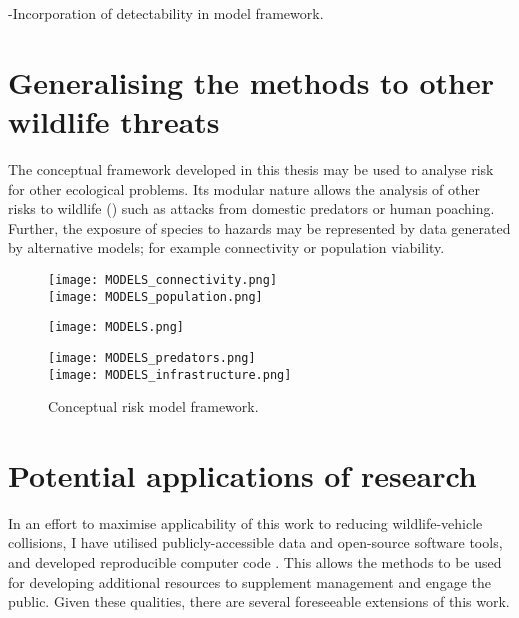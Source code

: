 -Incorporation of detectability in model framework.

\section{Generalising the methods to other wildlife threats}

The conceptual framework developed in this thesis may be used to analyse risk for other ecological problems. Its modular nature allows the analysis of other risks to wildlife () such as attacks from domestic predators or human poaching. Further, the exposure of species to hazards may be represented by data generated by alternative models; for example connectivity or population viability.

\begin{figure*}[htp]
  \centering
  	\begin{minipage}[t][][b]{.13\textwidth}
    	\centering
    	\texttt{[image: MODELS\_connectivity.png]}\\
    	\texttt{[image: MODELS\_population.png]}   	
    \end{minipage}
    \hspace{.05\textwidth}
  	\begin{minipage}{.38\textwidth}
    	\centering
    	\texttt{[image: MODELS.png]}
    \end{minipage}
    \hspace{.05\textwidth}
  	\begin{minipage}[t][][b]{.13\textwidth}
    	\centering
    	\texttt{[image: MODELS\_predators.png]}\\
    	\texttt{[image: MODELS\_infrastructure.png]}
    \end{minipage}    	   	   
  \caption[Conceptual risk model framework]{Conceptual risk model framework.}
  \label{gen_framework}
\end{figure*}

\section{Potential applications of research}

In an effort to maximise applicability of this work to reducing wildlife-vehicle collisions, I have utilised publicly-accessible data and open-source software tools, and developed reproducible computer code . This allows the methods to be used for developing additional resources to supplement management and engage the public. Given these qualities, there are several foreseeable extensions of this work. 

